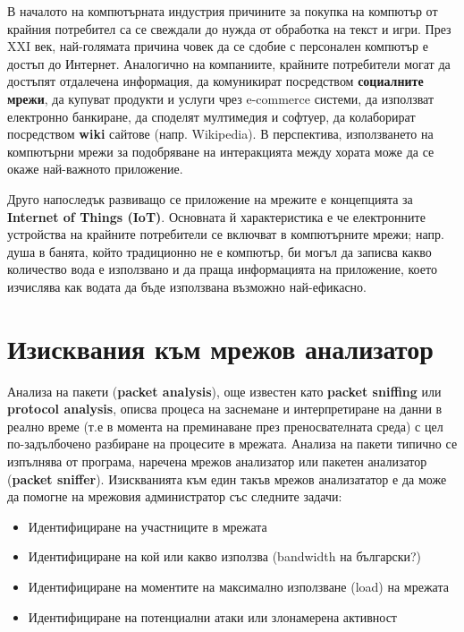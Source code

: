\documentclass[12pt,a4paper,oneside]{book}
\begin{document}
В началото на компютърната индустрия причините за покупка на компютър от крайния
потребител са се свеждали до нужда от обработка на текст и игри. През XXI век,
най-голямата причина човек да се сдобие с персонален компютър е достъп до
Интернет. Аналогично на компаниите, крайните потребители могат да достъпят
отдалечена информация, да комуникират посредством \textbf{социалните мрежи},
да купуват продукти и услуги чрез e-commerce системи, да използват електронно
банкиране, да споделят мултимедия и софтуер, да колаборират посредством
\textbf{wiki} сайтове (напр. Wikipedia).  В перспектива, използването на
компютърни мрежи за подобряване на интеракцията
между хората може да се окаже най-важното приложение.

Друго напоследък развиващо се приложение на мрежите е концепцията за 
\textbf{Internet of Things (IoT)}. Основната й характеристика е че електронните
устройства на крайните потребители се включват в компютърните мрежи; напр. душа
в банята, който традиционно не е компютър, би могъл да записва какво количество
вода е използвано и да праща информацията на приложение, което изчислява как
водата да бъде използвана възможно най-ефикасно.  \cite{tanenbaum_computer_2011}

\section{Изисквания към мрежов анализатор}

Анализа на пакети (\textbf{packet analysis}), още известен като
\textbf{packet sniffing} или \textbf{protocol analysis}, описва процеса на
заснемане и интерпретиране на данни в
реално време (т.е в момента на преминаване през преносвателната среда) с цел
по-задълбочено разбиране на процесите в мрежата. Анализа на пакети типично се
изпълнява от програма, наречена мрежов анализатор или пакетен анализатор
(\textbf{packet
sniffer}). \cite{sanders_practical_2011}
Изискванията към един такъв мрежов анализататор е да може да помогне
на мрежовия администратор със следните задачи:

\begin{itemize}
\item
  Идентифициране на участниците в мрежата
\item
  Идентифициране на кой или какво използва (bandwidth на български?)
\item
  Идентифициране на моментите на максимално използване (load) на мрежата
\item
  Идентифициране на потенциални атаки или злонамерена активност
\end{itemize}
\end{document}
